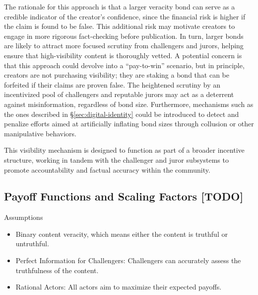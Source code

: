 \documentclass{article}
\begin{document}
The rationale for this approach is that a larger veracity bond can serve as a credible indicator of the creator’s confidence, since the financial risk is higher if the claim is found to be false. This additional risk may motivate creators to engage in more rigorous fact-checking before publication. In turn, larger bonds are likely to attract more focused scrutiny from challengers and jurors, helping ensure that high-visibility content is thoroughly vetted. A potential concern is that this approach could devolve into a ``pay-to-win'' scenario, but in principle, creators are not purchasing visibility; they are staking a bond that can be forfeited if their claims are proven false. The heightened scrutiny by an incentivized pool of challengers and reputable jurors may act as a deterrent against misinformation, regardless of bond size. Furthermore, mechanisms such as the ones described in \S\ref{sec:digital-identity} could be introduced to detect and penalize efforts aimed at artificially inflating bond sizes through collusion or other manipulative behaviors.

This visibility mechanism is designed to function as part of a broader incentive structure, working in tandem with the challenger and juror subsystems to promote accountability and factual accuracy within the community.


\iffalse %
\subsection{Payoff Functions and Scaling Factors [TODO]}

Assumptions

\begin{itemize}
    \item  Binary content veracity, which means either the content is truthful or untruthful. 
    \item Perfect Information for Challengers: Challengers can accurately assess the truthfulness of the content.
    \item Rational Actors: All actors aim to maximize their expected payoffs.
\end{itemize}
\end{document}
